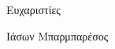 \vspace*{\fill}  
Ευχαριστίες
\begin{flushright}
Ιάσων Μπαρμπαρέσος
\end{flushright}
\vspace*{\fill}

\newpage

